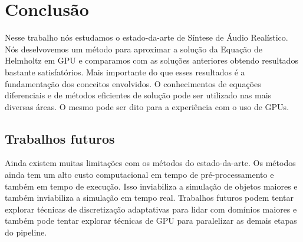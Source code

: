 \chapter{Conclusão}

Nesse trabalho nós estudamos o estado-da-arte de Síntese de Áudio Realístico. Nós deselvovemos um método para aproximar a solução da Equação de Helmholtz em GPU e comparamos com as soluções anteriores obtendo resultados bastante satisfatórios. Mais importante do que esses resultados é a fundamentação dos conceitos envolvidos. O conhecimentos de equações diferenciais e de métodos eficientes de solução pode ser utilizado nas mais diversas áreas. O mesmo pode ser dito para a  experiência com o uso de GPUs.

\section{Trabalhos futuros}

Ainda existem muitas limitações com os métodos do estado-da-arte. Os métodos ainda tem um alto custo computacional em tempo de pré-processamento e também em tempo de execução. Isso inviabiliza a simulação de objetos maiores e também inviabiliza a simulação em tempo real. Trabalhos futuros podem tentar explorar técnicas de discretização adaptativas para lidar com domínios maiores e também pode tentar explorar técnicas de GPU para paralelizar as demais etapas do pipeline.